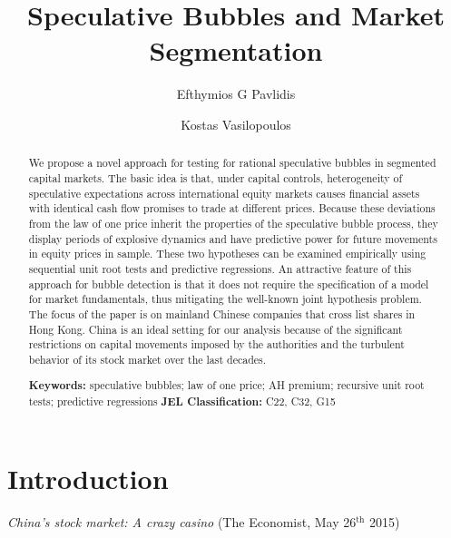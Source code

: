 \documentclass[11pt]{article}
\begin{document}
\title{Speculative Bubbles and Market Segmentation}

\author[a]{Efthymios G Pavlidis} 
\author[a]{Kostas Vasilopoulos}


\date{}
\maketitle

\begin{abstract}
We propose a novel approach for testing for rational speculative bubbles in segmented capital markets. The basic idea is that, under capital controls, heterogeneity of speculative expectations across international equity markets causes financial assets with identical cash flow promises to trade at different prices. Because these deviations from the law of one price inherit the properties of the speculative bubble process, they display periods of explosive dynamics and have predictive power for future movements in equity prices in sample. These two hypotheses can be examined empirically using sequential unit root tests and predictive regressions. An attractive feature of this approach for bubble detection is that it does not require the specification of a model for market fundamentals, thus mitigating the well-known joint hypothesis problem. The focus of the paper is on mainland Chinese companies that cross list shares in Hong Kong. China is an ideal setting for our analysis because of the significant restrictions on capital movements imposed by the authorities and the turbulent behavior of its stock market over the last decades.
\begin{flushleft}
\textbf{Keywords:} speculative bubbles; law of one price; AH premium; recursive unit root tests; predictive regressions    
\newline
 \textbf{JEL Classification:} C22, C32, G15
\end{flushleft}
\end{abstract}


\section{Introduction}

\begin{center}
\textit{China's stock market: A crazy casino} (The Economist, May 26$^{\text{th}}$ 2015)
\vspace{-.1cm}
\end{center}
\end{document}
